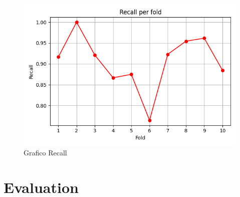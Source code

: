 \documentclass[a4paper,12pt]{report}
\begin{document}
\vspace*{\fill}
\newpage
\vspace*{\fill}
\begin{figure}[h]
\centering
\includegraphics[width=\textwidth]{recall.png}
\caption{Grafico Recall}
\end{figure}
\vspace*{\fill}
\newpage

\begingroup%
\makeatletter%
\let\clearpage\relax%
\vspace*{\fill}%
\vspace*{\dimexpr-50\p@-\baselineskip}%
\chapter{Evaluation}
\vspace*{\fill}%
\endgroup
\newpage
\end{document}
